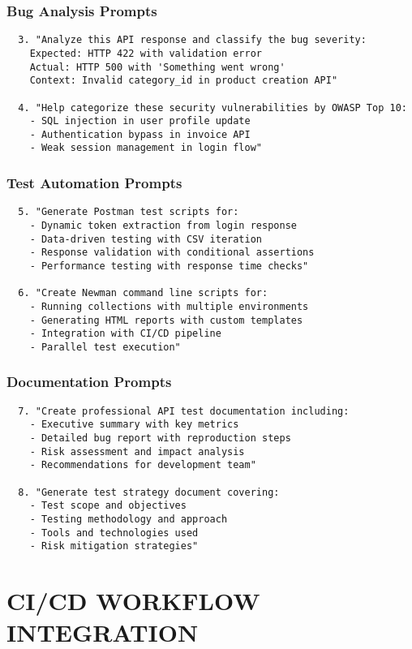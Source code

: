 \documentclass[12pt,a4paper]{article}
\begin{document}
  \subsubsection{Bug Analysis Prompts}
  \begin{lstlisting}
  3. "Analyze this API response and classify the bug severity:
    Expected: HTTP 422 with validation error
    Actual: HTTP 500 with 'Something went wrong'
    Context: Invalid category_id in product creation API"

  4. "Help categorize these security vulnerabilities by OWASP Top 10:
    - SQL injection in user profile update
    - Authentication bypass in invoice API
    - Weak session management in login flow"
  \end{lstlisting}

  \subsubsection{Test Automation Prompts}
  \begin{lstlisting}
  5. "Generate Postman test scripts for:
    - Dynamic token extraction from login response
    - Data-driven testing with CSV iteration
    - Response validation with conditional assertions
    - Performance testing with response time checks"

  6. "Create Newman command line scripts for:
    - Running collections with multiple environments
    - Generating HTML reports with custom templates
    - Integration with CI/CD pipeline
    - Parallel test execution"
  \end{lstlisting}

  \subsubsection{Documentation Prompts}
  \begin{lstlisting}
  7. "Create professional API test documentation including:
    - Executive summary with key metrics
    - Detailed bug report with reproduction steps
    - Risk assessment and impact analysis
    - Recommendations for development team"

  8. "Generate test strategy document covering:
    - Test scope and objectives
    - Testing methodology and approach
    - Tools and technologies used
    - Risk mitigation strategies"
  \end{lstlisting}

  \section{CI/CD WORKFLOW INTEGRATION}
\end{document}
